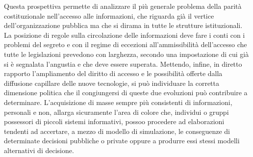 Questa prospettiva permette di analizzare il più generale problema della parità costituzionale nell’accesso alle informazioni, che riguarda già il vertice dell’organizzazione pubblica ma che si dirama in tutte le strutture istituzionali. La posizione di regole sulla circolazione delle informazioni deve fare i conti con i problemi del segreto e con il regime di eccezioni all’ammissibilità dell’accesso che tutte le legislazioni prevedono con larghezza, secondo una impostazione di cui già si è segnalata l’angustia e che deve essere superata.
Mettendo, infine, in diretto rapporto l’ampliamento del diritto di accesso e le possibilità offerte dalla diffusione capillare delle nuove tecnologie, si può individuare la corretta dimensione politica che il congiungersi di queste due evoluzioni può contribuire a determinare. L’acquisizione di masse sempre più consistenti di informazioni, personali e non, allarga sicuramente l’area di colore che, individui o gruppi possessori di piccoli sistemi informativi, possoo procedere ad elaborazioni tendenti ad accertare, a mezzo di modello di simulazione, le conseguenze di determinate decisioni pubbliche o private oppure a produrre essi stessi modelli alternativi di decisione. 


